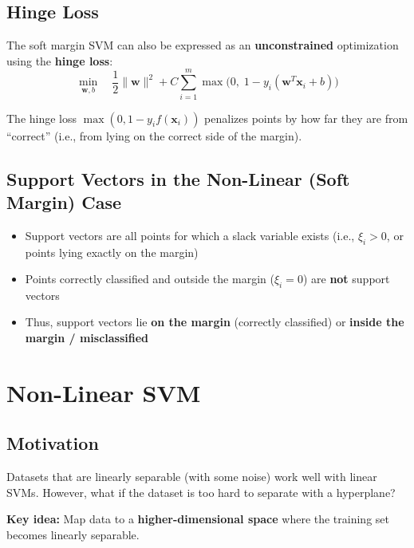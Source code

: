 \documentclass[11pt,a4paper]{article}
\theoremstyle{definition}
\theoremstyle{plain}
\theoremstyle{remark}
\begin{document}
\subsection{Hinge Loss}

The soft margin SVM can also be expressed as an \textbf{unconstrained} optimization using the \textbf{hinge loss}:
\[
\min_{\mathbf{w}, b} \quad \frac{1}{2} \|\mathbf{w}\|^2 + C \sum_{i=1}^{m} \max\!\big(0, \; 1 - y_i(\mathbf{w}^T \mathbf{x}_i + b)\big)
\]

The hinge loss $\max(0, 1 - y_i f(\mathbf{x}_i))$ penalizes points by how far they are from ``correct'' (i.e., from lying on the correct side of the margin).

\subsection{Support Vectors in the Non-Linear (Soft Margin) Case}

\begin{itemize}
    \item Support vectors are all points for which a slack variable exists (i.e., $\xi_i > 0$, or points lying exactly on the margin)
    \item Points correctly classified and outside the margin ($\xi_i = 0$) are \textbf{not} support vectors
    \item Thus, support vectors lie \textbf{on the margin} (correctly classified) or \textbf{inside the margin / misclassified}
\end{itemize}


\section{Non-Linear SVM}

\subsection{Motivation}

Datasets that are linearly separable (with some noise) work well with linear SVMs. However, what if the dataset is too hard to separate with a hyperplane?

\textbf{Key idea:} Map data to a \textbf{higher-dimensional space} where the training set becomes linearly separable.
\end{document}
